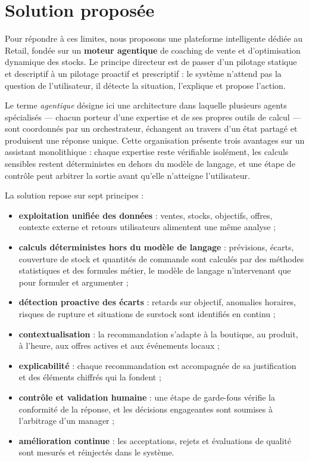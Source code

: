 \section{Solution proposée}

Pour répondre à ces limites, nous proposons une plateforme intelligente dédiée au Retail, fondée sur un \textbf{moteur agentique} de coaching de vente et d'optimisation dynamique des stocks. Le principe directeur est de passer d'un pilotage statique et descriptif à un pilotage proactif et prescriptif : le système n'attend pas la question de l'utilisateur, il détecte la situation, l'explique et propose l'action.

Le terme \textit{agentique} désigne ici une architecture dans laquelle plusieurs agents spécialisés — chacun porteur d'une expertise et de ses propres outils de calcul — sont coordonnés par un orchestrateur, échangent au travers d'un état partagé et produisent une réponse unique. Cette organisation présente trois avantages sur un assistant monolithique : chaque expertise reste vérifiable isolément, les calculs sensibles restent déterministes en dehors du modèle de langage, et une étape de contrôle peut arbitrer la sortie avant qu'elle n'atteigne l'utilisateur.

La solution repose sur sept principes :

\begin{itemize}[label=--]
    \item \textbf{exploitation unifiée des données} : ventes, stocks, objectifs, offres, contexte externe et retours utilisateurs alimentent une même analyse ;
    \item \textbf{calculs déterministes hors du modèle de langage} : prévisions, écarts, couverture de stock et quantités de commande sont calculés par des méthodes statistiques et des formules métier, le modèle de langage n'intervenant que pour formuler et argumenter ;
    \item \textbf{détection proactive des écarts} : retards sur objectif, anomalies horaires, risques de rupture et situations de surstock sont identifiés en continu ;
    \item \textbf{contextualisation} : la recommandation s'adapte à la boutique, au produit, à l'heure, aux offres actives et aux événements locaux ;
    \item \textbf{explicabilité} : chaque recommandation est accompagnée de sa justification et des éléments chiffrés qui la fondent ;
    \item \textbf{contrôle et validation humaine} : une étape de garde-fous vérifie la conformité de la réponse, et les décisions engageantes sont soumises à l'arbitrage d'un manager ;
    \item \textbf{amélioration continue} : les acceptations, rejets et évaluations de qualité sont mesurés et réinjectés dans le système.
\end{itemize}


